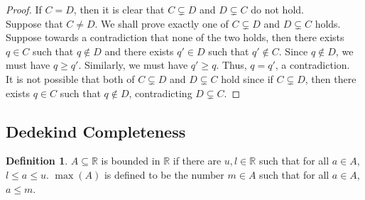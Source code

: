 \documentclass[14pt]{article}
\theoremstyle{definition}
\newtheorem{definition}{Definition}[subsection]
\newcommand{\bb}[1]{\mathbb{#1}}
\begin{document}
\begin{proof}
    If $C=D$, then it is clear that $C\subsetneq D$ and $D\subsetneq C$ do not hold. \\
    Suppose that $C\not=D$. We shall prove exactly one of $C\subsetneq D$ and $D\subsetneq C$ holds.\\
    Suppose towards a contradiction that none of the two holds, then there exists 
    $q\in C$ such that $q\notin D$ and there exists $q'\in D$ such that $q'\notin C$. 
    Since $q\not\in D$, we must have $q\geq q'$. Similarly, we must have $q'\geq q$. Thus,
    $q=q'$, a contradiction.\\
    It is not possible that both of $C\subsetneq D$ and $D\subsetneq C$ hold since if 
    $C\subsetneq D$, then there exists $q\in C$ such that $q\notin D$, contradicting  
    $D\subsetneq C$.
\end{proof}

\vspace{5mm}

\subsection{Dedekind Completeness}
\begin{definition}
    $A\subseteq\bb{R}$ is bounded in $\bb{R}$ if there are $u,l\in \bb{R}$ such that for all 
    $a\in A$, $l\leq a\leq u$. $\max(A)$ is defined to be the number $m\in A$ such that for all $a\in A$, $a\leq m$.
 \end{definition}

 \vspace{2mm}
\end{document}
